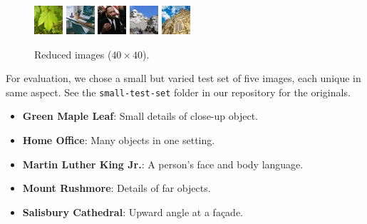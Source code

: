 \documentclass[letterpaper,12pt]{article}
\begin{document}
\begin{figure}[h!]
    \includegraphics[width=.2\textwidth]{small-test-set_reduced/green-maple-leaf.jpg}\hfill
    \includegraphics[width=.2\textwidth]{small-test-set_reduced/home-office.jpg}\hfill
    \includegraphics[width=.2\textwidth]{small-test-set_reduced/martin-luther-king.jpg}\hfill
    \includegraphics[width=.2\textwidth]{small-test-set_reduced/mount-rushmore.jpg}\hfill
    \includegraphics[width=.2\textwidth]{small-test-set_reduced/salisbury-cathedral.jpg}
    \caption{Reduced images ($40\times40$).}
\end{figure}

For evaluation, we chose a small but varied test set of five images, each unique in same aspect. See the \texttt{small-test-set} folder in our repository for the originals.

\begin{itemize}
    \item \textbf{Green Maple Leaf}: Small details of close-up object.
    \item \textbf{Home Office}: Many objects in one setting.
    \item \textbf{Martin Luther King Jr.}: A person's face and body language.
    \item \textbf{Mount Rushmore}: Details of far objects.
    \item \textbf{Salisbury Cathedral}: Upward angle at a façade.
\end{itemize}
\end{document}
